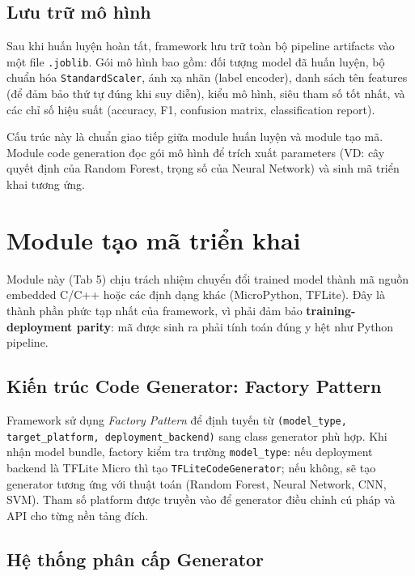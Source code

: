 \subsection{Lưu trữ mô hình}
\label{subsec:model_serialization}

Sau khi huấn luyện hoàn tất, framework lưu trữ toàn bộ pipeline artifacts vào một file \texttt{.joblib}. Gói mô hình bao gồm: đối tượng model đã huấn luyện, bộ chuẩn hóa \texttt{StandardScaler}, ánh xạ nhãn (label encoder), danh sách tên features (để đảm bảo thứ tự đúng khi suy diễn), kiểu mô hình, siêu tham số tốt nhất, và các chỉ số hiệu suất (accuracy, F1, confusion matrix, classification report).

Cấu trúc này là chuẩn giao tiếp giữa module huấn luyện và module tạo mã. Module code generation đọc gói mô hình để trích xuất parameters (VD: cây quyết định của Random Forest, trọng số của Neural Network) và sinh mã triển khai tương ứng.

\section{Module tạo mã triển khai}
\label{sec:code_generation_module}

Module này (Tab 5) chịu trách nhiệm chuyển đổi trained model thành mã nguồn embedded C/C++ hoặc các định dạng khác (MicroPython, TFLite). Đây là thành phần phức tạp nhất của framework, vì phải đảm bảo \textbf{training-deployment parity}: mã được sinh ra phải tính toán đúng y hệt như Python pipeline.

\subsection{Kiến trúc Code Generator: Factory Pattern}
\label{subsec:code_generator_factory}

Framework sử dụng \textit{Factory Pattern} để định tuyến từ \texttt{(model\_type, target\_platform, deployment\_backend)} sang class generator phù hợp. Khi nhận model bundle, factory kiểm tra trường \texttt{model\_type}: nếu deployment backend là TFLite Micro thì tạo \texttt{TFLiteCodeGenerator}; nếu không, sẽ tạo generator tương ứng với thuật toán (Random Forest, Neural Network, CNN, SVM). Tham số platform được truyền vào để generator điều chỉnh cú pháp và API cho từng nền tảng đích.

\subsection{Hệ thống phân cấp Generator}
\label{subsec:generator_hierarchy}

